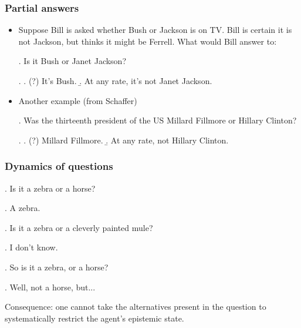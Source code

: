 \begin{frame}

\frametitle{Partial answers}

\begin{itemize}

\item Suppose Bill is asked whether Bush or Jackson is on TV. Bill
is certain it is not Jackson, but thinks it might be Ferrell. What
would Bill answer to:

\ex. Is it Bush or Janet Jackson?

\ex. \a. (?) It's Bush. \b. At any rate, it's not Janet
Jackson.\pause

\item Another example (from Schaffer)

\ex. Was the thirteenth president of the US Millard Fillmore or
Hillary Clinton?

\ex. \a. (?) Millard Fillmore. \b. At any rate, not Hillary
Clinton.

\end{itemize}


\end{frame}


\begin{frame}

\frametitle{Dynamics of questions}

\ex. Is it a zebra or a horse?

\ex. A zebra.

\ex. Is it a zebra or a cleverly painted mule?

\ex. I don't know.

\ex. So is it a zebra, or a horse?

\ex. Well, not a horse, but...

\alert{Consequence}: one cannot take the alternatives present in
the question to systematically restrict the agent's epistemic
state.


\end{frame}


